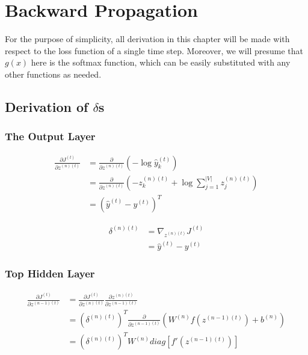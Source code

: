 \documentclass{article}
\begin{document}
	\section{Backward Propagation}
	For the purpose of simplicity, all derivation in this chapter will be made with respect to the loss function of a single time step. Moreover, we will presume that $g(x)$ here is the softmax function, which can be easily substituted with any other functions as needed. 
	\subsection{Derivation of $\delta$s}
	\subsubsection{The Output Layer}
	\begin{equation}
	\begin{aligned}
		\frac{\partial J^{(t)}}{\partial z^{(n)(t)}} 
		&= \frac{\partial}{\partial z^{(n)(t)}} (-\log{\hat{y}^{(t)}_k}) \\
		&= \frac{\partial}{\partial z^{(n)(t)}} (-z^{(n)(t)}_k + \log{\sum_{j=1}^{|V|} z^{(n)(t)}_j}) \\
		&= (\hat{y}^{(t)} - y^{(t)})^T 
	\end{aligned}
	\end{equation}
	
	\begin{equation}
	\begin{aligned}
		\delta^{(n)(t)} 
		&= \nabla_{z^{(n)(t)}} J^{(t)} \\
		&= \hat{y}^{(t)} - y^{(t)} 
	\end{aligned}
	\end{equation}
	
	\subsubsection{Top Hidden Layer}
	\begin{equation}
		\begin{aligned}
		\frac{\partial J^{(t)}}{\partial z^{(n-1)(t)}} 
		&= \frac{\partial J^{(t)}}{\partial z^{(n)(t)}} 
		\frac{\partial z^{(n)(t)}}{\partial z^{(n-1)(t)}} \\
		&= (\delta^{(n)(t)})^T  \frac{\partial}{\partial z^{(n-1)(t)}} (W^{(n)} f(z^{(n-1)(t)}) + b^{(n)})\\
		&= (\delta^{(n)(t)})^T  W^{(n)}  diag[f'(z^{(n-1)(t)})]
		\end{aligned}
	\end{equation}
	
\end{document}
